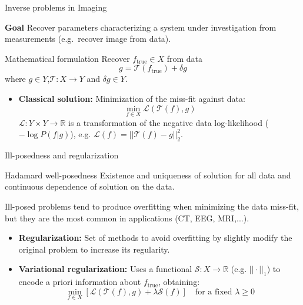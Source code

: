 \begin{frame}{Inverse problems in Imaging}
\begin{block}{\textbf{Goal}}
Recover parameters characterizing a system under investigation from measurements (e.g.\ recover image from data).
\end{block}
\pause
\bigskip

\begin{block}{Mathematical formulation}
Recover $f_{\text{true}}\in X$ from data
$$
g = \mathcal{T}(f_{\text{true}})+\delta g
$$
where $g\in Y$,$\mathcal{T}:X\longrightarrow Y$ and $\delta g\in Y$.
\end{block}

\pause
\bigskip

\begin{itemize}
\item \textbf{Classical solution:} 
Minimization of the miss-fit against data:
$$
\min_{f\in X}\mathcal{L}(\mathcal{T}(f),g)
$$
$\mathcal{L}:Y\times Y\longrightarrow \mathbb{R}$ is a transformation of the negative data log-likelihood ($-\log P(f|g)$), e.g. $\mathcal{L}(f)=||\mathcal{T}(f)-g||_2^2$.
\end{itemize}
\end{frame}

\begin{frame}{Ill-posedness and regularization}


\begin{block}{Hadamard well-posedness}
 Existence and uniqueness of solution for all data and continuous dependence of solution on the data.
\end{block}

\begin{block}{}
Ill-posed problems tend to produce overfitting when minimizing the data miss-fit, but they are the most common in applications (CT, EEG, MRI,...).
\end{block}

\bigskip
\pause
\begin{itemize}
\item \textbf{Regularization:} Set of methods to avoid overfitting by slightly modify the original problem to increase its regularity.

\bigskip
\pause
\item \textbf{Variational regularization:} Uses a functional $\mathcal{S}:X\longrightarrow \mathbb{R}$ (e.g. $||\cdot||_1$) to encode a priori information about $f_{\text{true}}$, obtaining:
$$
\min_{f\in X}\left[\mathcal{L}(\mathcal{T}(f),g)+\lambda \mathcal{S}(f)\right]\quad \text{for a fixed $\lambda\geq 0$}
$$

\end{itemize}
\end{frame}



